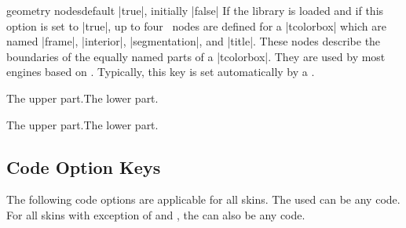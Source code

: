 \clearpage
\begin{docTcbKey}{geometry nodes}{}{default |true|, initially |false|}
  If the  library is loaded and if this option is set to |true|,
  up to four \tikzname\ nodes are defined for a |tcolorbox|
  which are named |frame|, |interior|, |segmentation|, and |title|. These nodes
  describe the boundaries of the equally named parts of a |tcolorbox|.
  They are used by most engines based on \tikzname.
  Typically, this key is set automatically by a .
\begin{dispExample}

\begin{tcolorbox}[adjusted title=The title]
  The upper part.\tcblower The lower part.
\end{tcolorbox}
\begin{tcolorbox}[enhanced,adjusted title=The title,
  frame code={\path[draw=red,fill=red!25]
      (frame.south west) rectangle (frame.north east);},
  interior titled code={\path[draw=blue,fill=blue!25]
      (interior.south west) rectangle (interior.north east);},
  segmentation code={\path[draw=green,fill=green!25]
      (segmentation.south west) rectangle (segmentation.north east);},
  title code={\path[draw=black,fill=brown!75!black]
      (title.south west) rectangle (title.north east);}]
  The upper part.\tcblower The lower part.
\end{tcolorbox}
\end{dispExample}
\end{docTcbKey}






\clearpage
\subsection{Code Option Keys}\label{subsec:addcodeoptions}
The following code options are applicable for all skins.
The used  can be any  code. For all skins
with exception of 
and , the  can also
be any  code.


